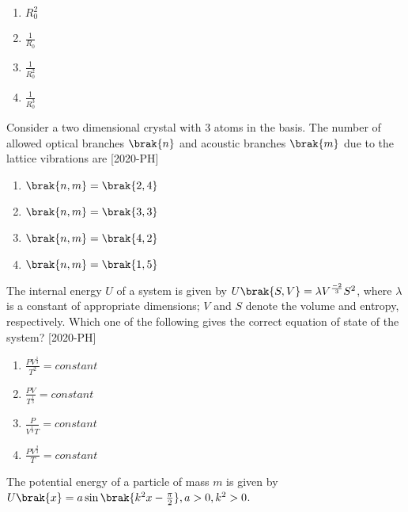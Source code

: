 \begin{enumerate}
    \item $R_{0}^2$\\
    \item $\frac{1}{R_0}$\\
    \item $\frac{1}{R_0 ^2}$\\
    \item $\frac{1}{R_0 ^3}$\\
\end{enumerate}
\item Consider a two dimensional crystal with 3 atoms in the basis. The number of allowed optical branches $\brak{n}$ and acoustic branches $\brak{m}$ due to the lattice vibrations are \hfill{[2020-PH]}\\
\begin{enumerate}
    \item $\brak{n, m}=\brak{2, 4}$
    \item $\brak{n, m}=\brak{3, 3}$
    \item $\brak{n, m}=\brak{4, 2}$
    \item $\brak{n, m}=\brak{1, 5}$
\end{enumerate}
\item The internal energy $U$ of a system is given by $U\brak{S,V}=\lambda V^ \frac{-2}{3} S^2$, where $\lambda$ is a constant of appropriate dimensions; $V$ and $S$ denote the volume and entropy, respectively. Which one of the following gives the correct equation of state of the system? \hfill{[2020-PH]}\\
\begin{enumerate}
    \item $\frac{PV^ \frac{1}{3}}{T^2}=constant$\\
    \item $\frac{PV}{T^ \frac{1}{3}}=constant$\\
    \item $\frac{P}{V^ \frac{1}{3}T}=constant$\\
    \item $\frac{PV^ \frac{2}{3}}{T}=constant$\\
\end{enumerate}
\item The potential energy of a particle of mass $m$ is given by \\
$U \brak{x}=a\sin \brak{k^2 x-\frac{\pi}{2}}, a>0, k^2>0$.\\

